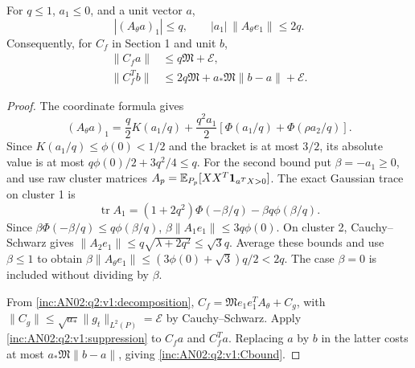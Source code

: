 \documentclass[11pt]{article}
\numberwithin{equation}{section}
\theoremstyle{remark}\newtheorem{remark}[theorem]{Remark}
\begin{document}
\begin{lemma}
\label{inc:AN02:q2:v1:gaussiansuppression}
For $q\le1$, $a_1\le0$, and a unit vector $a$,
\begin{equation}\label{inc:AN02:q2:v1:suppression}
 |(A_\theta a)_1|\le q,\qquad
 |a_1|\,\|A_\theta e_1\|\le2q.
\end{equation}
Consequently, for $C_f$ in Section 1 and unit $b$,
\begin{align}
 \|C_fa\|&\le q\mathfrak M+\mathcal E,\nonumber\\
 \|C_f^Tb\|&\le2q\mathfrak M
           +a_*\mathfrak M\|b-a\|+\mathcal E.
 \label{inc:AN02:q2:v1:Cbound}
\end{align}
\end{lemma}
\begin{proof}
The coordinate formula gives
\[
 (A_\theta a)_1=\frac q2K(a_1/q)
 +\frac{q^2a_1}{2}[\Phi(a_1/q)+\Phi(\rho a_2/q)].
\]
Since $K(a_1/q)\le\phi(0)<1/2$ and the bracket is at most $3/2$,
its absolute value is at most $q\phi(0)/2+3q^2/4\le q$.
For the second bound put $\beta=-a_1\ge0$, and use raw cluster
matrices $A_p=\mathbb E_{P_p}[XX^T\mathbf1_{a^TX>0}]$.
The exact Gaussian trace on cluster 1 is
\[
 \operatorname{tr}A_1=(1+2q^2)\Phi(-\beta/q)
                         -\beta q\phi(\beta/q).
\]
Since $\beta\Phi(-\beta/q)\le q\phi(\beta/q)$,
$\beta\|A_1e_1\|\le3q\phi(0)$. On cluster 2, Cauchy--Schwarz gives
$\|A_2e_1\|\le q\sqrt{\lambda+2q^2}\le\sqrt3q$.
Average these bounds and use $\beta\le1$ to obtain
$\beta\|A_\theta e_1\|\le(3\phi(0)+\sqrt3)q/2<2q$.
The case $\beta=0$ is included without dividing by $\beta$.

From \eqref{inc:AN02:q2:v1:decomposition},
$C_f=\mathfrak M e_1e_1^TA_\theta+C_g$, with
$\|C_g\|\le\sqrt{a_*}\|g_t\|_{L^2(P)}=\mathcal E$ by
Cauchy--Schwarz. Apply \eqref{inc:AN02:q2:v1:suppression} to
$C_fa$ and $C_f^Ta$. Replacing $a$ by $b$ in the latter costs at most
$a_*\mathfrak M\|b-a\|$, giving \eqref{inc:AN02:q2:v1:Cbound}.
\end{proof}
\end{document}
